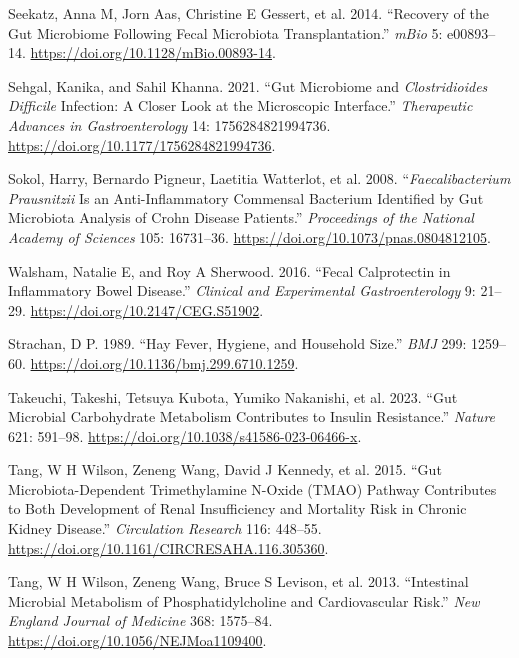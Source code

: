 \documentclass[
  11pt,
]{article}
\newlength{\cslhangindent}
\newenvironment{CSLReferences}[2] %
 {\begin{list}{}{%
  \setlength{\itemindent}{0pt}
  \setlength{\leftmargin}{0pt}
  \setlength{\parsep}{0pt}
  \ifodd #1
   \setlength{\leftmargin}{\cslhangindent}
   \setlength{\itemindent}{-1\cslhangindent}
  \fi
  \setlength{\itemsep}{#2\baselineskip}}}
 {\end{list}}
\begin{document}
\begin{CSLReferences}{1}{0}
Seekatz, Anna M, Jorn Aas, Christine E Gessert, et al. 2014. {``Recovery
of the Gut Microbiome Following Fecal Microbiota Transplantation.''}
\emph{mBio} 5: e00893--14. \url{https://doi.org/10.1128/mBio.00893-14}.

Sehgal, Kanika, and Sahil Khanna. 2021. {``Gut Microbiome and
\emph{{C}lostridioides Difficile} Infection: A Closer Look at the
Microscopic Interface.''} \emph{Therapeutic Advances in
Gastroenterology} 14: 1756284821994736.
\url{https://doi.org/10.1177/1756284821994736}.

Sokol, Harry, Bernardo Pigneur, Laetitia Watterlot, et al. 2008.
{``\emph{{F}aecalibacterium Prausnitzii} Is an Anti-Inflammatory
Commensal Bacterium Identified by Gut Microbiota Analysis of {C}rohn
Disease Patients.''} \emph{Proceedings of the National Academy of
Sciences} 105: 16731--36. \url{https://doi.org/10.1073/pnas.0804812105}.

Walsham, Natalie E, and Roy A Sherwood. 2016. {``Fecal Calprotectin in
Inflammatory Bowel Disease.''} \emph{Clinical and Experimental
Gastroenterology} 9: 21--29.
\url{https://doi.org/10.2147/CEG.S51902}.

Strachan, D P. 1989. {``Hay Fever, Hygiene, and Household Size.''}
\emph{BMJ} 299: 1259--60.
\url{https://doi.org/10.1136/bmj.299.6710.1259}.

Takeuchi, Takeshi, Tetsuya Kubota, Yumiko Nakanishi, et al. 2023. {``Gut
Microbial Carbohydrate Metabolism Contributes to Insulin Resistance.''}
\emph{Nature} 621: 591--98.
\url{https://doi.org/10.1038/s41586-023-06466-x}.

Tang, W H Wilson, Zeneng Wang, David J Kennedy, et al. 2015. {``Gut
Microbiota-Dependent Trimethylamine {N}-Oxide ({TMAO}) Pathway
Contributes to Both Development of Renal Insufficiency and Mortality
Risk in Chronic Kidney Disease.''} \emph{Circulation Research} 116:
448--55. \url{https://doi.org/10.1161/CIRCRESAHA.116.305360}.

Tang, W H Wilson, Zeneng Wang, Bruce S Levison, et al. 2013.
{``Intestinal Microbial Metabolism of Phosphatidylcholine and
Cardiovascular Risk.''} \emph{New England Journal of Medicine} 368:
1575--84. \url{https://doi.org/10.1056/NEJMoa1109400}.


\end{CSLReferences}
\end{document}
